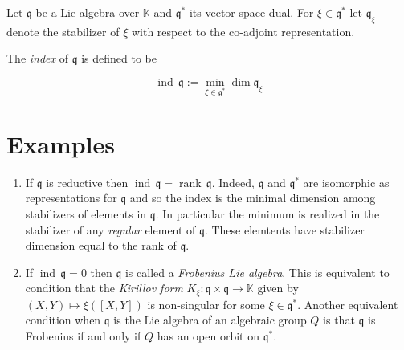 \documentclass[12pt]{article}
\DeclareMathOperator{\ind}{ind \,}
\DeclareMathOperator{\rank}{rank \,}
\begin{document}
Let $\mathfrak{q}$ be a Lie algebra over $\mathbb{K}$ and $\mathfrak{q}^*$ its vector space dual. For $\xi \in \mathfrak{q}^*$ let $\mathfrak{q}_{\xi}$ denote the stabilizer of $\xi$ with respect to the co-adjoint representation. 

The \emph{index} of $\mathfrak{q}$ is defined to be

\[ \ind \mathfrak{q} := \min\limits_{\xi \in \mathfrak{g}^*} \dim 
\mathfrak{q}_{\xi} \]

\section*{Examples}

\begin{enumerate}

\item If $\mathfrak{q}$ is reductive then $\ind \mathfrak{q} = \rank \mathfrak{q}$. Indeed, $\mathfrak{q}$ and $\mathfrak{q}^*$ are isomorphic as
representations for $\mathfrak{q}$ and so the index is the minimal dimension among stabilizers of elements in $\mathfrak{q}$. In particular the minimum is realized in the stabilizer of any \emph{regular} element of $\mathfrak{q}$. These elemtents have stabilizer dimension equal to the rank of $\mathfrak{q}$.

\item If $\ind \mathfrak{q} = 0$ then $\mathfrak{q}$ is called a 
\emph{Frobenius Lie algebra}. This is equivalent to condition that
the \emph{Kirillov form} $K_{\xi} \colon \mathfrak{q} \times \mathfrak{q} \to 
\mathbb{K}$ given by $(X,Y) \mapsto \xi([X,Y])$ is non-singular for some $\xi \in \mathfrak{q}^*$. Another equivalent condition when $\mathfrak{q}$ is the Lie algebra of an algebraic group $Q$ is that $\mathfrak{q}$ is Frobenius if and only if $Q$ has an open orbit on $\mathfrak{q}^*$.

\end{enumerate}
\end{document}
